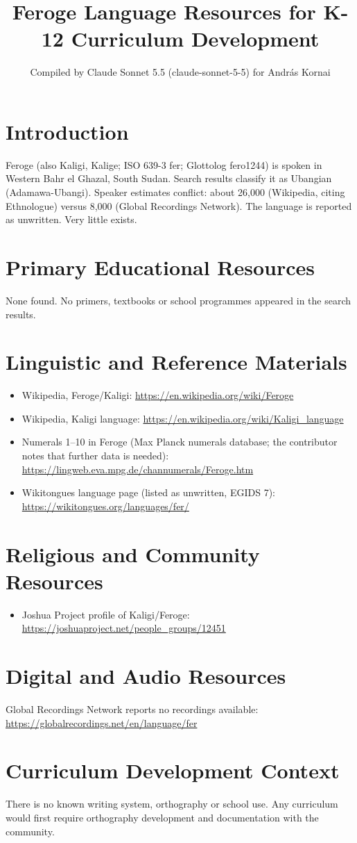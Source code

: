 \documentclass[12pt]{article}
\title{Feroge Language Resources for K-12 Curriculum Development}
\author{Compiled by Claude Sonnet 5.5 (claude-sonnet-5-5) for Andr\'as Kornai}
\date{}
\begin{document}
\maketitle
\section{Introduction}
Feroge (also Kaligi, Kalige; ISO 639-3 fer; Glottolog fero1244) is spoken in Western Bahr el Ghazal, South Sudan. Search results classify it as Ubangian (Adamawa-Ubangi). Speaker estimates conflict: about 26,000 (Wikipedia, citing Ethnologue) versus 8,000 (Global Recordings Network). The language is reported as unwritten. Very little exists.
\section{Primary Educational Resources}
None found. No primers, textbooks or school programmes appeared in the search results.
\section{Linguistic and Reference Materials}
\begin{itemize}
\item Wikipedia, Feroge/Kaligi: \url{https://en.wikipedia.org/wiki/Feroge}
\item Wikipedia, Kaligi language: \url{https://en.wikipedia.org/wiki/Kaligi_language}
\item Numerals 1--10 in Feroge (Max Planck numerals database; the contributor notes that further data is needed): \url{https://lingweb.eva.mpg.de/channumerals/Feroge.htm}
\item Wikitongues language page (listed as unwritten, EGIDS 7): \url{https://wikitongues.org/languages/fer/}
\end{itemize}
\section{Religious and Community Resources}
\begin{itemize}
\item Joshua Project profile of Kaligi/Feroge: \url{https://joshuaproject.net/people_groups/12451}
\end{itemize}
\section{Digital and Audio Resources}
Global Recordings Network reports no recordings available: \url{https://globalrecordings.net/en/language/fer}
\section{Curriculum Development Context}
There is no known writing system, orthography or school use. Any curriculum would first require orthography development and documentation with the community.
\end{document}
